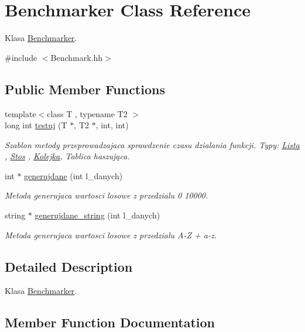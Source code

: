 \hypertarget{a00002}{}\section{Benchmarker Class Reference}
\label{a00002}


Klasa \hyperlink{a00002}{Benchmarker}.  




{\ttfamily \#include $<$Benchmark.\+hh$>$}

\subsection*{Public Member Functions}
\begin{DoxyCompactItemize}
\item 
{\footnotesize template$<$class T , typename T2 $>$ }\\long int \hyperlink{a00002_ad6df6fab21d465a48e8acdf5acf63e60}{testuj} (T $\ast$, T2 $\ast$, int, int)
\begin{DoxyCompactList}\small\item\em Szablon metody przeprowadzajaca sprawdzenie czasu dzialania funkcji. Typy\+: \hyperlink{a00005}{Lista} , \hyperlink{a00006}{Stos} , \hyperlink{a00004}{Kolejka}, Tablica haszująca. \end{DoxyCompactList}\item 
int $\ast$ \hyperlink{a00002_a8f93cdbd1a844b6a51842c1d438f5352}{generujdane} (int l\+\_\+danych)
\begin{DoxyCompactList}\small\item\em Metoda generujaca wartosci losowe z przedzialu 0 10000. \end{DoxyCompactList}\item 
string $\ast$ \hyperlink{a00002_af5c1417e405a81de8b1f185c755e3b82}{generujdane\+\_\+string} (int l\+\_\+danych)
\begin{DoxyCompactList}\small\item\em Metoda generujaca wartosci losowe z przedzialu A-\/\+Z + a-\/z. \end{DoxyCompactList}\end{DoxyCompactItemize}


\subsection{Detailed Description}
Klasa \hyperlink{a00002}{Benchmarker}. 

\subsection{Member Function Documentation}
\hypertarget{a00002_a8f93cdbd1a844b6a51842c1d438f5352}{}
